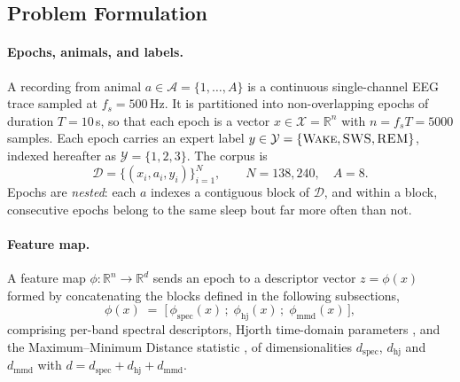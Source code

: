 \subsection{Problem Formulation}
\label{sec:problem}

\paragraph{Epochs, animals, and labels.}
A recording from animal $a \in \mathcal{A} = \{1,\dots,A\}$ is a continuous single-channel EEG trace sampled at $f_s = 500$\,Hz. It is partitioned into non-overlapping epochs of duration $T = 10$\,s, so that each epoch is a vector $x \in \mathcal{X} = \mathbb{R}^{n}$ with $n = f_s T = 5000$ samples. Each epoch carries an expert label $y \in \mathcal{Y} = \{\textsc{Wake}, \textsc{SWS}, \textsc{REM}\}$, indexed hereafter as $\mathcal{Y} = \{1,2,3\}$. The corpus is
\begin{equation}
\mathcal{D} = \{(x_i, a_i, y_i)\}_{i=1}^{N},
\qquad N = 138{,}240, \quad A = 8 .
\end{equation}
Epochs are \emph{nested}: each $a$ indexes a contiguous block of $\mathcal{D}$, and within a block, consecutive epochs belong to the same sleep bout far more often than not.

\paragraph{Feature map.}
A feature map $\phi:\mathbb{R}^{n}\to\mathbb{R}^{d}$ sends an epoch to a descriptor vector $z = \phi(x)$ formed by concatenating the blocks defined in the following subsections,
\begin{equation}
\phi(x) \;=\; \big[\, \phi_{\mathrm{spec}}(x)\,;\; \phi_{\mathrm{hj}}(x)\,;\; \phi_{\mathrm{mmd}}(x) \,\big],
\label{eq:featuremap}
\end{equation}
comprising per-band spectral descriptors, Hjorth time-domain parameters \citep{hjorth1970}, and the Maximum--Minimum Distance statistic \citep{e18090272}, of dimensionalities $d_{\mathrm{spec}}$, $d_{\mathrm{hj}}$ and $d_{\mathrm{mmd}}$ with $d = d_{\mathrm{spec}} + d_{\mathrm{hj}} + d_{\mathrm{mmd}}$.

